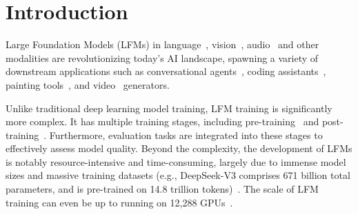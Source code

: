 \section{Introduction}
\label{sec:intro}

Large Foundation Models (LFMs) in language~\cite{gpt4,llama3.1, gemini1.5, deepseek-v3}, vision~\cite{diffusion, dit}, audio~\cite{bark} and other modalities are revolutionizing today's AI landscape, spawning a variety of downstream applications such as conversational agents~\cite{chatgpt, character-ai}, coding assistants~\cite{github-copilot}, painting tools~\cite{midjourney}, and video~\cite{sora} generators.

Unlike traditional deep learning model training, LFM training is significantly more complex.
It has multiple training stages, including pre-training~\cite{gpt3, megascale} and post-training~\cite{wei2021sft,rlhf, hybridflow, ppo-framework}.
Furthermore, evaluation tasks are integrated into these stages to effectively assess model quality. Beyond the complexity, the development of LFMs is notably resource-intensive and time-consuming, largely due to immense model sizes and massive training datasets (e.g., DeepSeek-V3 comprises 671 billion total parameters, and is pre-trained on 14.8 trillion tokens)~\cite{llama3.1, deepseek-v3}.
The scale of LFM training can even be up to running on 12,288 GPUs~\cite{megascale}.


